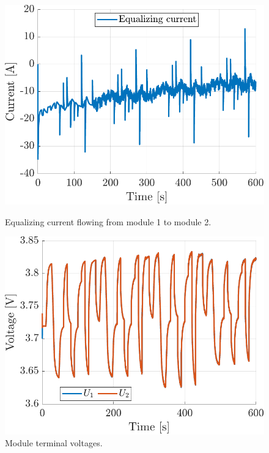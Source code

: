 \begin{figure}[]
\centering
\begin{minipage}{0.49\textwidth}
    \centering
    \includegraphics[width=\linewidth]{figures/13/fb-IE.pdf}
    \caption{Equalizing current flowing from module 1 to module 2.}
    \label{fig:13-IE}
\end{minipage}
\hfill
\begin{minipage}{0.49\textwidth}
    \centering
    \includegraphics[width=\linewidth]{figures/13/ff-U.pdf}
    \caption{Module terminal voltages.}
    \label{fig:13-U}
\end{minipage}
\end{figure}

